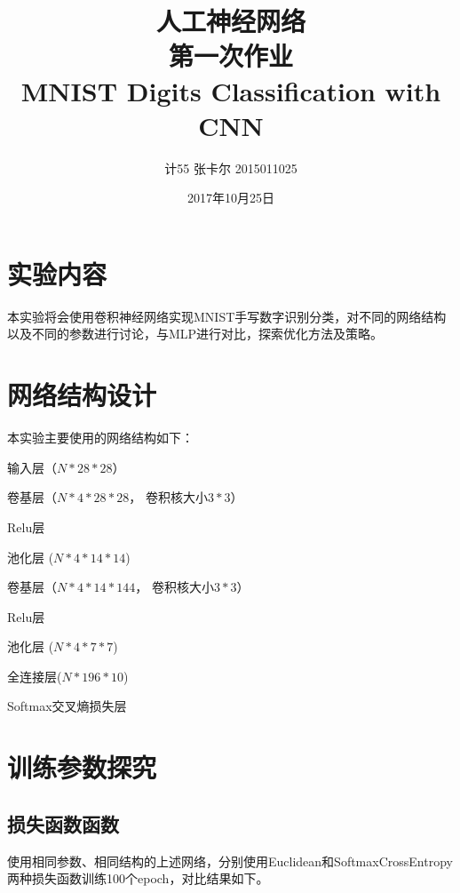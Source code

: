 \documentclass[11pt,utf8]{article}
\begin{document}
    
    \let\enumerate\compactenum
    \let\endenumerate\endcompactenum
    \let\itemize\compactitem
    \let\enditemize\endcompactitem
    \setlength{\pltopsep}{5pt}
    \setlength{\parindent}{2em}
    \setlength{\footskip}{30pt}
    \setlength{\baselineskip}{1.3\baselineskip}
    \renewcommand\arraystretch{1.2}
    
    
    \title{人工神经网络\\第一次作业\\MNIST Digits Classification with CNN}
    \date{2017年10月25日}
    \author{计55 张卡尔 2015011025}
      \maketitle
      \section*{实验内容}
        \indent 本实验将会使用卷积神经网络实现MNIST手写数字识别分类，对不同的网络结构以及不同的参数进行讨论，与MLP进行对比，探索优化方法及策略。\\
      \section*{网络结构设计}
        本实验主要使用的网络结构如下：
        \begin{itemize}
          \item 输入层（$N*28*28$）
          \item 卷基层（$N*4*28*28$， 卷积核大小$3*3$）
          \item Relu层
          \item 池化层 ($N*4*14*14$)
          \item 卷基层（$N*4*14*144$， 卷积核大小$3*3$）
          \item Relu层
          \item 池化层 ($N*4*7*7$)
          \item 全连接层($N*196*10$)
          \item Softmax交叉熵损失层
        \end{itemize}
        
        \section*{训练参数探究}
          
          \subsection*{损失函数函数}
            \indent 使用相同参数、相同结构的上述网络，分别使用Euclidean和SoftmaxCrossEntropy两种损失函数训练100个epoch，对比结果如下。\\
            
\end{document}
